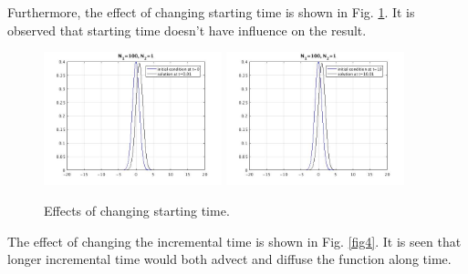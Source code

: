 \documentclass[12pt]{article}
\begin{document}
Furthermore, the effect of changing starting time is shown in Fig. \ref{fig3}. It is observed that starting time doesn't have influence on the result.

\begin{figure}[H]
\begin{center}

\includegraphics[width=0.46\textwidth]{norm.jpg} 
\includegraphics[width=0.46\textwidth]{t10.jpg}  \\
\hspace*{0.2truecm}

\caption{Effects of changing starting time.} 
\label{fig3}
\end{center}
\end{figure}

The effect of changing the incremental time is shown in Fig. \ref{fig4}. It is seen that longer incremental time would both advect and diffuse the function along time. 
\end{document}
